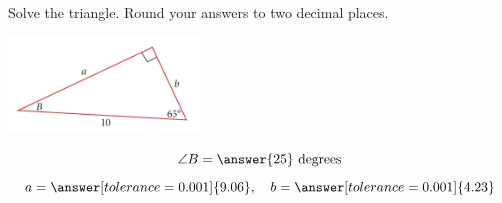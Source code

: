 \documentclass{ximera}
\begin{document}
\begin{problem}\label{prob:160hom10prob6}
Solve the triangle. Round your answers to two decimal places.
\begin{image}
   \includegraphics[height=1in]{160H10pic4.jpg}~
 \end{image}

$$\angle B=\answer{25}\mbox{ degrees}$$
$$a=\answer[tolerance=0.001]{9.06},\quad b=\answer[tolerance=0.001]{4.23}$$
\end{problem}
\end{document}
